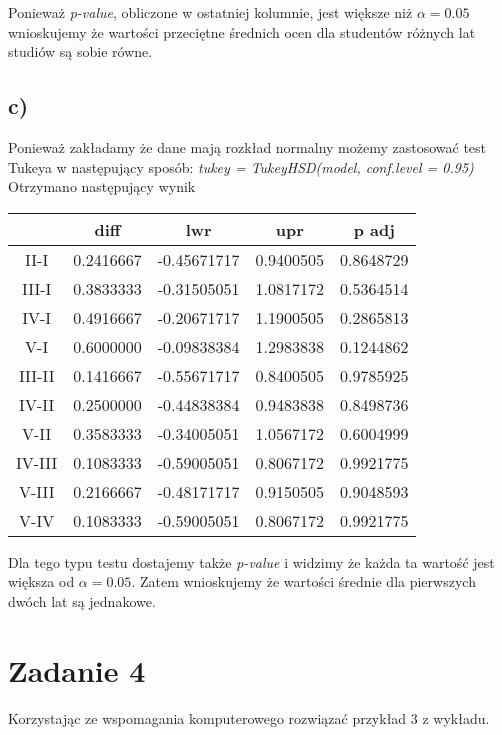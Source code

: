 \documentclass{article}
\begin{document}
Ponieważ \textit{p-value}, obliczone w ostatniej kolumnie, jest większe niż $\alpha = 0.05$ wnioskujemy że wartości przeciętne średnich ocen dla studentów różnych lat studiów są sobie równe.

\subsection{c)}
Ponieważ zakładamy że dane mają rozkład normalny możemy zastosować test Tukeya w następujący sposób: \textit{tukey = TukeyHSD(model, conf.level = 0.95)}
Otrzymano następujący wynik
\begin{center} \begin{tabular}{|c|c|c|c|c|} \hline
& diff & lwr & upr & p adj \\ \hline
II-I & 0.2416667 & -0.45671717 & 0.9400505 & 0.8648729 \\ \hline
III-I & 0.3833333 & -0.31505051 & 1.0817172 & 0.5364514 \\ \hline
IV-I & 0.4916667 & -0.20671717 & 1.1900505 & 0.2865813 \\ \hline
V-I & 0.6000000 & -0.09838384 & 1.2983838 & 0.1244862 \\ \hline
III-II & 0.1416667 & -0.55671717 & 0.8400505 & 0.9785925 \\ \hline
IV-II & 0.2500000 & -0.44838384 & 0.9483838 & 0.8498736 \\ \hline
V-II & 0.3583333 & -0.34005051 & 1.0567172 & 0.6004999 \\ \hline
IV-III & 0.1083333 & -0.59005051 & 0.8067172 & 0.9921775 \\ \hline
V-III & 0.2166667 & -0.48171717 & 0.9150505 & 0.9048593 \\ \hline
V-IV & 0.1083333 & -0.59005051 & 0.8067172  & 0.9921775 \\ \hline
\end{tabular} \end{center}

Dla tego typu testu dostajemy także \textit{p-value} i widzimy że każda ta wartość jest większa od $\alpha = 0.05$. Zatem wnioskujemy że wartości średnie dla pierwszych dwóch lat są jednakowe.

\newpage
\section{Zadanie 4}
Korzystając ze wspomagania komputerowego rozwiązać przykład 3 z wykładu. \\ \par
\end{document}
